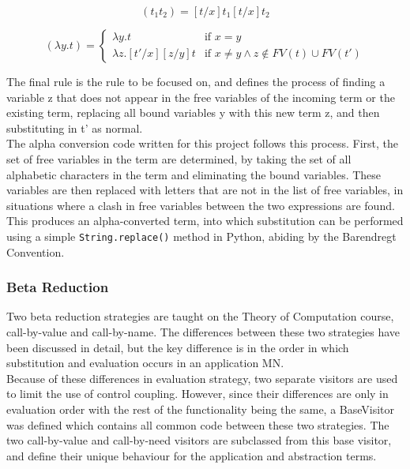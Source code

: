 \documentclass[a4paper,12pt]{report}
\begin{document}
\begin{equation*}
[t/x](t_1t_2)=[t/x]t_1[t/x]t_2
\end{equation*}

\begin{equation*}
[t'/x](\lambda y.t)=\begin{cases}
\lambda y.t & \text{if $x=y$}\\
\lambda z.[t'/x][z/y]t & \text{if $x\ne y \land z\notin FV(t) \cup FV(t')$}
\end{cases}
\end{equation*}

The final rule is the rule to be focused on, and defines the process of finding a variable z that does not appear in the free variables of the incoming term or the existing term, replacing all bound variables y with this new term z, and then substituting in t’ as normal.\\

The alpha conversion code written for this project follows this process. First, the set of free variables in the term are determined, by taking the set of all alphabetic characters in the term and eliminating the bound variables. These variables are then replaced with letters that are not in the list of free variables, in situations where a clash in free variables between the two expressions are found. This produces an alpha-converted term, into which substitution can be performed using a simple \texttt{String.replace()} method in Python, abiding by the Barendregt Convention.

\subsubsection{Beta Reduction}

Two beta reduction strategies are taught on the Theory of Computation course, call-by-value and call-by-name. The differences between these two strategies have been discussed in detail, but the key difference is in the order in which substitution and evaluation occurs in an application MN.\\

Because of these differences in evaluation strategy, two separate visitors are used to limit the use of control coupling\cite{Lethbridge2004}. However, since their differences are only in evaluation order with the rest of the functionality being the same, a BaseVisitor was defined which contains all common code between these two strategies. The two call-by-value and call-by-need visitors are subclassed from this base visitor, and define their unique behaviour for the application and abstraction terms.\\
\end{document}
